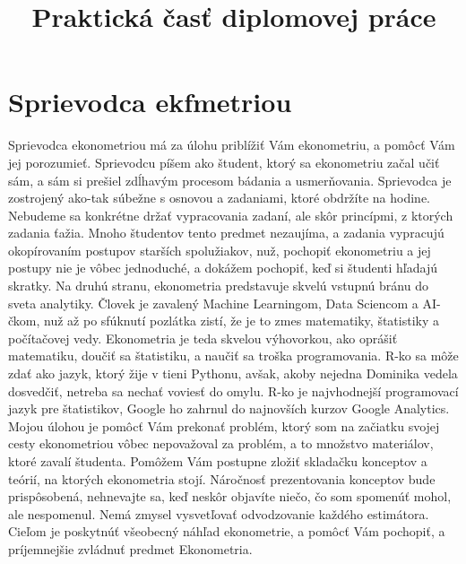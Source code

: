\title{Praktická časť diplomovej práce}
\author{}
\date{\vspace{-2.5em}}



\maketitle

\hypertarget{sprievodca-ekfmetriou}{%
\section{Sprievodca ekfmetriou}\label{sprievodca-ekfmetriou}}

Sprievodca ekonometriou má za úlohu priblížiť Vám ekonometriu, a pomôcť
Vám jej porozumieť. Sprievodcu píšem ako študent, ktorý sa ekonometriu
začal učiť sám, a sám si prešiel zdĺhavým procesom bádania a
usmerňovania. Sprievodca je zostrojený ako-tak súbežne s osnovou a
zadaniami, ktoré obdržíte na hodine. Nebudeme sa konkrétne držať
vypracovania zadaní, ale skôr princípmi, z ktorých zadania ťažia. Mnoho
študentov tento predmet nezaujíma, a zadania vypracujú okopírovaním
postupov starších spolužiakov, nuž, pochopiť ekonometriu a jej postupy
nie je vôbec jednoduché, a dokážem pochopiť, keď si študenti hľadajú
skratky. Na druhú stranu, ekonometria predstavuje skvelú vstupnú bránu
do sveta analytiky. Človek je zavalený Machine Learningom, Data Sciencom
a AI-čkom, nuž až po sfúknutí pozlátka zistí, že je to zmes matematiky,
štatistiky a počítačovej vedy. Ekonometria je teda skvelou výhovorkou,
ako oprášiť matematiku, doučiť sa štatistiku, a naučiť sa troška
programovania. R-ko sa môže zdať ako jazyk, ktorý žije v tieni Pythonu,
avšak, akoby nejedna Dominika vedela dosvedčiť, netreba sa nechať
voviesť do omylu. R-ko je najvhodnejší programovací jazyk pre
štatistikov, Google ho zahrnul do najnovších kurzov Google Analytics.
Mojou úlohou je pomôcť Vám prekonať problém, ktorý som na začiatku
svojej cesty ekonometriou vôbec nepovažoval za problém, a to množstvo
materiálov, ktoré zavalí študenta. Pomôžem Vám postupne zložiť skladačku
konceptov a teórií, na ktorých ekonometria stojí. Náročnosť
prezentovania konceptov bude prispôsobená, nehnevajte sa, keď neskôr
objavíte niečo, čo som spomenúť mohol, ale nespomenul. Nemá zmysel
vysvetľovať odvodzovanie každého estimátora. Cieľom je poskytnúť
všeobecný náhľad ekonometrie, a pomôcť Vám pochopiť, a príjemnejšie
zvládnuť predmet Ekonometria.

~

